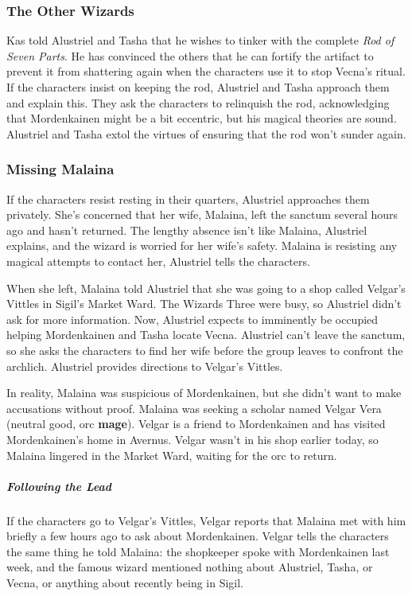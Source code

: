 \documentclass[10pt,a4paper,twoside,bg=print,twocolumn,openany,nodeprecatedcode]{dndbook}
\begin{document}
\subsubsection{The Other Wizards}
Kas told Alustriel and Tasha that he wishes to tinker with the complete \textit{Rod of Seven Parts}. He has convinced the others that he can fortify the artifact to prevent it from shattering again when the characters use it to stop Vecna's ritual. If the characters insist on keeping the rod, Alustriel and Tasha approach them and explain this. They ask the characters to relinquish the rod, acknowledging that Mordenkainen might be a bit eccentric, but his magical theories are sound. Alustriel and Tasha extol the virtues of ensuring that the rod won't sunder again.

\subsubsection{Missing Malaina}
If the characters resist resting in their quarters, Alustriel approaches them privately. She's concerned that her wife, Malaina, left the sanctum several hours ago and hasn't returned. The lengthy absence isn't like Malaina, Alustriel explains, and the wizard is worried for her wife's safety. Malaina is resisting any magical attempts to contact her, Alustriel tells the characters.

When she left, Malaina told Alustriel that she was going to a shop called Velgar's Vittles in Sigil's Market Ward. The Wizards Three were busy, so Alustriel didn't ask for more information. Now, Alustriel expects to imminently be occupied helping Mordenkainen and Tasha locate Vecna. Alustriel can't leave the sanctum, so she asks the characters to find her wife before the group leaves to confront the archlich. Alustriel provides directions to Velgar's Vittles.

In reality, Malaina was suspicious of Mordenkainen, but she didn't want to make accusations without proof. Malaina was seeking a scholar named Velgar Vera (neutral good, orc \textbf{mage}). Velgar is a friend to Mordenkainen and has visited Mordenkainen's home in Avernus. Velgar wasn't in his shop earlier today, so Malaina lingered in the Market Ward, waiting for the orc to return.

\subparagraph{Following the Lead}
If the characters go to Velgar's Vittles, Velgar reports that Malaina met with him briefly a few hours ago to ask about Mordenkainen. Velgar tells the characters the same thing he told Malaina: the shopkeeper spoke with Mordenkainen last week, and the famous wizard mentioned nothing about Alustriel, Tasha, or Vecna, or anything about recently being in Sigil.
\end{document}
